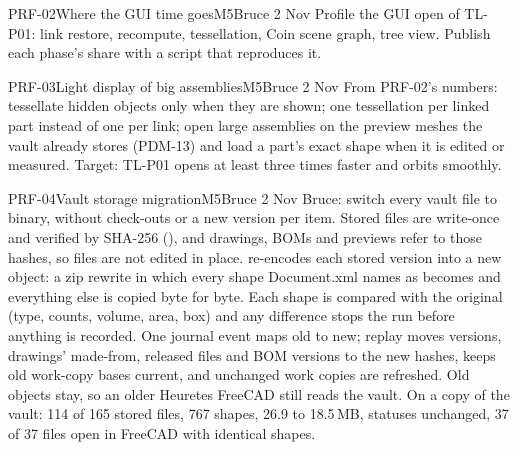 \begin{epic}{PRF-02}{Where the GUI time goes}{M5}{\stTodo}{Bruce 2 Nov}
Profile the GUI open of TL-P01: link restore, recompute, tessellation, Coin scene graph, tree view. Publish
each phase's share with a script that reproduces it.
\end{epic}

\begin{epic}{PRF-03}{Light display of big assemblies}{M5}{\stTodo}{Bruce 2 Nov}
From PRF-02's numbers: tessellate hidden objects only when they are shown; one tessellation per linked part
instead of one per link; open large assemblies on the preview meshes the vault already stores (PDM-13) and load
a part's exact shape when it is edited or measured. Target: TL-P01 opens at least three times faster and orbits
smoothly.
\end{epic}

\begin{epic}{PRF-04}{Vault storage migration}{M5}{\stProg}{Bruce 2 Nov}
Bruce: switch every vault file to binary, without check-outs or a new version per item. Stored files are
write-once and verified by SHA-256 (), and drawings, BOMs and previews refer to those
hashes, so files are not edited in place.  re-encodes each stored version into a
new object: a zip rewrite in which every shape Document.xml names as  becomes  and
everything else is copied byte for byte. Each shape is compared with the original (type, counts, volume, area,
box) and any difference stops the run before anything is recorded. One  journal event
maps old to new; replay moves versions, drawings' made-from, released files and BOM versions to the new hashes,
 keeps old work-copy bases current, and unchanged work copies are refreshed. Old
objects stay, so an older Heuretes FreeCAD still reads the vault. On a copy of the vault: 114 of 165 stored files,
767 shapes, 26.9 to 18.5\,MB, statuses unchanged, 37 of 37 files open in FreeCAD with identical shapes.
\end{epic}

